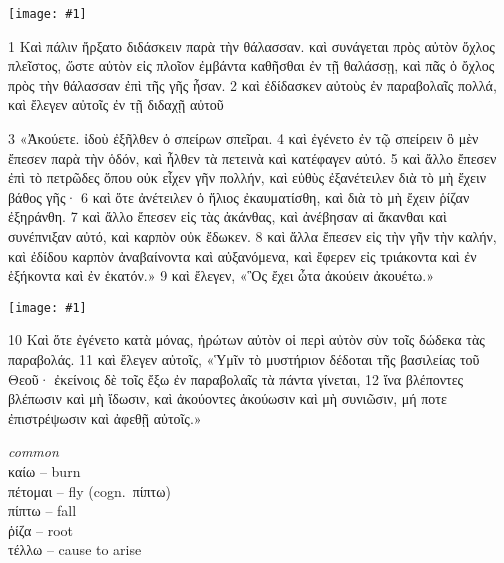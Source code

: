 \documentclass[10pt,a5paper,twoside,twocolumn]{book}
\newcommand{\fig}[1]{\texttt{[image: \#1]}\label{fig:#1}}
\newcommand*\cleartoleftpage{%
  \ifodd\value{page}\hbox{}\clearpage\fi
}
\newenvironment{facing}{\cleartoleftpage}{\clearpage\pagebreak}
\newenvironment{help}{\clearpage}{}
\newenvironment{helpsec}{\begin{minipage}[t]{\textwidth}\begin{multicols}{2}}{\end{multicols}\end{minipage}}
\newenvironment{vocab}{\begin{helpsec}}{\end{helpsec}}
\begin{document}

\begin{facing}

\fig{04-01} %

	1 Καὶ πάλιν ἤρξατο διδάσκειν παρὰ τὴν θάλασσαν. καὶ συνάγεται πρὸς αὐτὸν ὄχλος πλεῖστος, ὥστε αὐτὸν εἰς πλοῖον ἐμβάντα καθῆσθαι ἐν τῇ θαλάσσῃ, καὶ πᾶς ὁ ὄχλος πρὸς τὴν θάλασσαν ἐπὶ τῆς γῆς ἦσαν. 2 καὶ ἐδίδασκεν αὐτοὺς ἐν παραβολαῖς πολλά, καὶ ἔλεγεν αὐτοῖς ἐν τῇ διδαχῇ αὐτοῦ 

\enlargethispage{\baselineskip}

3 «Ἀκούετε. ἰδοὺ ἐξῆλθεν ὁ σπείρων σπεῖραι. 4 καὶ ἐγένετο ἐν τῷ σπείρειν ὃ μὲν ἔπεσεν παρὰ τὴν ὁδόν, καὶ ἦλθεν τὰ πετεινὰ καὶ κατέφαγεν αὐτό. 5 καὶ ἄλλο ἔπεσεν ἐπὶ τὸ πετρῶδες ὅπου οὐκ εἶχεν γῆν πολλήν, καὶ εὐθὺς ἐξανέτειλεν διὰ τὸ μὴ ἔχειν βάθος γῆς· 6 καὶ ὅτε ἀνέτειλεν ὁ ἥλιος ἐκαυματίσθη, καὶ διὰ τὸ μὴ ἔχειν ῥίζαν ἐξηράνθη. 7 καὶ ἄλλο ἔπεσεν εἰς τὰς ἀκάνθας, καὶ ἀνέβησαν αἱ ἄκανθαι καὶ συνέπνιξαν αὐτό, καὶ καρπὸν οὐκ ἔδωκεν. 8 καὶ ἄλλα ἔπεσεν εἰς τὴν γῆν τὴν καλήν, καὶ ἐδίδου καρπὸν ἀναβαίνοντα καὶ αὐξανόμενα, καὶ ἔφερεν εἰς τριάκοντα καὶ ἐν ἑξήκοντα καὶ ἐν ἑκατόν.» 
9 καὶ ἔλεγεν, «Ὃς ἔχει ὦτα ἀκούειν ἀκουέτω.»

\fig{04-03} %

\enlargethispage{\baselineskip}

10 Καὶ ὅτε ἐγένετο κατὰ μόνας, ἠρώτων αὐτὸν οἱ περὶ αὐτὸν σὺν τοῖς δώδεκα τὰς παραβολάς.
11 καὶ ἔλεγεν αὐτοῖς, «Ὑμῖν τὸ μυστήριον δέδοται τῆς βασιλείας τοῦ Θεοῦ· ἐκείνοις δὲ τοῖς ἔξω ἐν παραβολαῖς τὰ πάντα γίνεται, 12 ἵνα 
	βλέποντες βλέπωσιν καὶ μὴ ἴδωσιν, 
	καὶ ἀκούοντες ἀκούωσιν καὶ μὴ συνιῶσιν, 
		μή ποτε ἐπιστρέψωσιν καὶ ἀφεθῇ αὐτοῖς.»

\begin{help}
\begin{vocab}
\emph{common}\\
καίω -- burn\\
πέτομαι -- fly (cogn.~πίπτω)\\
πίπτω -- fall\\
ῥίζα -- root\\
τέλλω -- cause to arise\\


\end{vocab}
\end{help}
\end{facing}
\end{document}
